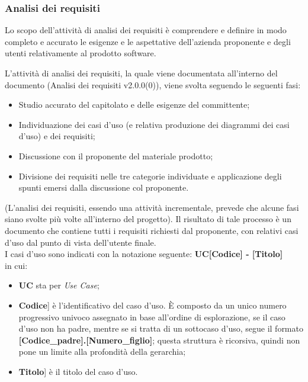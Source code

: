 \documentclass[10pt, a4paper]{article}
\begin{document}
\subsubsection{Analisi dei requisiti}
Lo scopo dell'attività di analisi dei requisiti è comprendere e definire in modo completo e accurato le esigenze e le aspettative dell'azienda proponente e degli utenti 
relativamente al prodotto software.

L'attività di analisi dei requisiti, la quale viene documentata all'interno del documento (Analisi dei requisiti v2.0.0(0)), viene svolta seguendo le seguenti fasi:
\begin{itemize}
    \item Studio accurato del capitolato e delle esigenze del committente;
    \item Individuazione dei casi d'uso (e relativa produzione dei diagrammi dei casi d'uso) e dei requisiti;
    \item Discussione con il proponente del materiale prodotto;
    \item Divisione dei requisiti nelle tre categorie individuate e applicazione degli spunti emersi dalla discussione col proponente.
\end{itemize}
(L'analisi dei requisiti, essendo una attività incrementale, prevede che alcune fasi siano svolte più volte all'interno del progetto).
Il risultato di tale processo è un documento che contiene tutti i requisiti richiesti dal proponente, con relativi casi d'uso dal punto di vista dell'utente finale.\\

I casi d'uso sono indicati con la notazione seguente: \textbf{UC[Codice] - [Titolo]}\\
in cui:
\begin{itemize}
\item \textbf{UC} sta per \textit{Use Case\pg};
\item \lbrack \textbf{Codice}] è l'identificativo del caso d'uso. È composto da un unico numero progressivo univoco assegnato in base all'ordine di esplorazione, se il caso d'uso non ha padre, mentre se si tratta di un sottocaso d'uso, segue il formato \textbf{[Codice\_padre].[Numero\_figlio]}; questa struttura è ricorsiva, quindi non pone un limite alla profondità della gerarchia;
\item \lbrack \textbf{Titolo}] è il titolo del caso d'uso.
\end{itemize}
\end{document}
